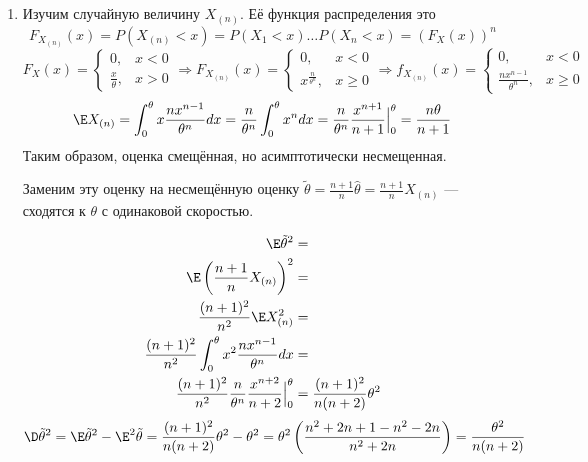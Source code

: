 \begin{example}
\begin{enumerate}
        \item Изучим случайную величину \(X_{(n)}\). Её функция распределения это
              \[F_{X_{(n)}}(x) = P(X_{(n)} < x) = P(X_1 < x) \dots P(X_n < x) = (F_X(x))^n\]
              \[F_X(x) = \begin{cases}
                      0,                & x < 0 \\
                      \frac{x}{\theta}, & x > 0
                  \end{cases} \Rightarrow F_{X_{(n)}}(x) = \begin{cases}
                      0,                    & x < 0    \\
                      x^\frac{n}{\theta^n}, & x \geq 0
                  \end{cases} \Rightarrow f_{X_{(n)}}(x) = \begin{cases}
                      0,                           & x < 0    \\
                      \frac{nx^{n - 1}}{\theta^n}, & x \geq 0
                  \end{cases}\]
              \[\E X_{(n)} = \int_0^\theta x \frac{nx^{n - 1}}{\theta^n} dx = \frac{n}{\theta^n} \int_0^\theta x^n dx = \frac{n}{\theta^n} \frac{x^{n + 1}}{n + 1} \Big|_0^\theta = \frac{n\theta}{n + 1}\]
              Таким образом, оценка смещённая, но асимптотически несмещенная.

              Заменим эту оценку на несмещённую оценку \(\tilde{\theta} = \frac{n + 1}{n} \hat{\theta} = \frac{n + 1}{n} X_{(n)}\) --- сходятся к \(\theta\) с одинаковой скоростью.

              \begin{align*}
                  \E \tilde{\theta}^2                                                            & =                                     \\
                  \E \left(\frac{n + 1}{n} X_{(n)}\right)^2                                      & =                                     \\
                  \frac{(n + 1)^2}{n^2} \E X_{(n)}^2                                             & =                                     \\
                  \frac{(n + 1)^2}{n^2} \int_0^\theta x^2 \frac{nx^{n - 1}}{\theta^n} dx         & =                                     \\
                  \frac{(n + 1)^2}{n^2} \frac{n}{\theta^n} \frac{x^{n + 2}}{n + 2}\Big|_0^\theta & = \frac{(n + 1)^2}{n(n + 2)} \theta^2
              \end{align*}
              \[\D \tilde{\theta}^2 = \E \tilde{\theta}^2 - \E^2 \tilde{\theta} = \frac{(n + 1)^2}{n(n + 2)} \theta^2 - \theta^2 = \theta^2 \left(\frac{n^2 + 2n + 1 - n^2 - 2n}{n^2 + 2n}\right) = \frac{\theta^2}{n(n + 2)}\]
    \end{enumerate}


\end{example}

